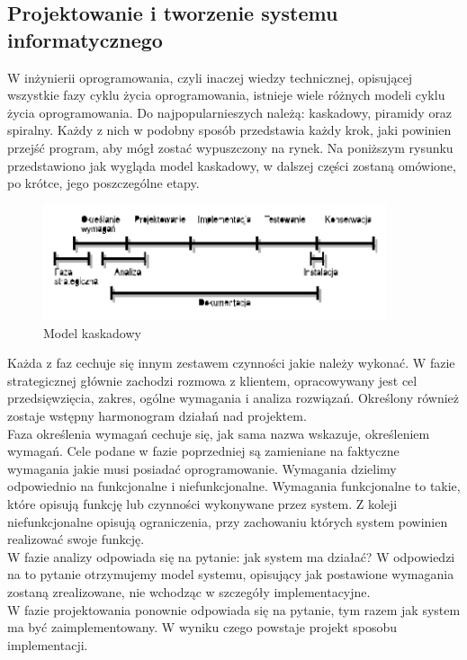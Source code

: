 \documentclass[12pt]{article}
\begin{document}
\begin{sloppypar}
{  \subsection{Projektowanie i tworzenie systemu informatycznego}
  {
    W inżynierii oprogramowania, czyli inaczej wiedzy technicznej, opisującej wszystkie fazy cyklu życia oprogramowania, istnieje wiele różnych modeli 
    cyklu życia oprogramowania. Do najpopularnieszych należą: kaskadowy, piramidy oraz spiralny. Każdy z nich w podobny sposób przedstawia każdy krok, 
    jaki powinien przejść program, aby mógł zostać wypuszczony na rynek. Na poniższym rysunku przedstawiono jak wygląda model kaskadowy, w dalszej części zostaną 
    omówione, po krótce, jego poszczególne etapy.
    \begin{figure}[H]
      \centering
      \includegraphics[width=0.9\textwidth]{model_kaskadowy}
      \caption{Model kaskadowy}
      \label{fig:cascade}
    \end{figure}
    Każda z faz cechuje się innym zestawem czynności jakie należy wykonać. 
    W fazie strategicznej głównie zachodzi rozmowa z klientem, opracowywany jest cel przedsięwzięcia, zakres, ogólne wymagania i analiza rozwiązań.
    Określony również zostaje wstępny harmonogram działań nad projektem.\\
    Faza określenia wymagań cechuje się, jak sama nazwa wskazuje, określeniem wymagań. Cele podane w fazie poprzedniej są zamieniane na faktyczne wymagania 
    jakie musi posiadać oprogramowanie. Wymagania dzielimy odpowiednio na funkcjonalne i niefunkcjonalne. 
    Wymagania funkcjonalne to takie, które opisują funkcję lub czynności wykonywane przez system. 
    Z koleji niefunkcjonalne opisują ograniczenia, przy zachowaniu których system powinien realizować swoje funkcję.\\
    W fazie analizy odpowiada się na pytanie: jak system ma działać? 
    W odpowiedzi na to pytanie otrzymujemy model systemu, opisujący jak postawione wymagania zostaną zrealizowane, nie wchodząc w szczegóły implementacyjne.\\
    W fazie projektowania ponownie odpowiada się na pytanie, tym razem jak system ma być zaimplementowany. W wyniku czego powstaje projekt sposobu implementacji.\\
}}
\end{sloppypar}
\end{document}
